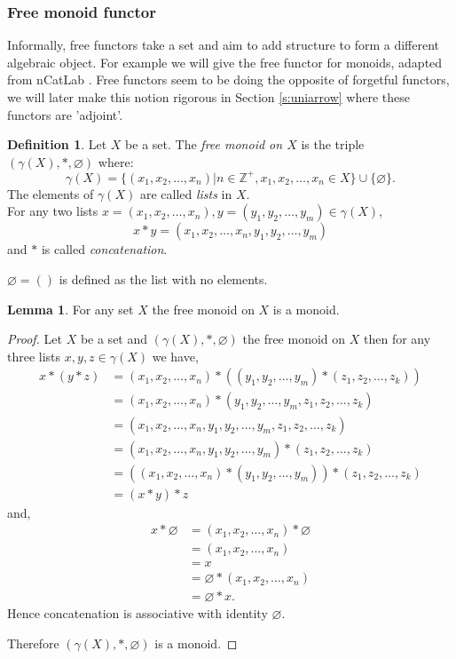 \documentclass[11pt,a4paper]{article}
\theoremstyle{definition}
\newtheorem{lemma}[thm]{Lemma}
\newtheorem{definition}[thm]{Definition}
\numberwithin{equation}{section}
\begin{document}
\subsubsection{Free monoid functor}
\label{sss:freefunctors}
Informally, free functors take a set and aim to add structure to form a different algebraic object. For example we will give the free functor for monoids, adapted from nCatLab \cite{nLab}. Free functors seem to be doing the opposite of forgetful functors, we will later make this notion rigorous in Section \ref{s:uniarrow} where these functors are 'adjoint'.
\begin{definition}
\label{def:freemonoid}
Let $X$ be a set. The \emph{free monoid on $X$} is the triple $(\gamma(X),*,\varnothing)$ where: \[\gamma(X)=\{(x_{1},x_{2},\dots,x_{n})|n\in\mathbb{Z}^{+}, x_{1},x_{2},\dots,x_{n}\in X\}\cup\{\varnothing\}.\] The elements of $\gamma(X)$ are called \emph{lists} in $X$.\\
    For any two lists $x=(x_{1},x_{2},\dots,x_{n}),y=(y_{1},y_{2},\dots,y_{m})\in\gamma(X)$, \[x*y = (x_{1},x_{2},\dots,x_{n},y_{1},y_{2},\dots,y_{m})\] and $*$ is called \emph{concatenation}.
    
    $\varnothing=()$ is defined as the list with no elements.
\end{definition}

\begin{lemma}
For any set $X$ the free monoid on $X$ is a monoid.
\end{lemma}
\begin{proof}
Let $X$ be a set and $(\gamma(X),*,\varnothing)$ the free monoid on $X$ then for any three lists $x,y,z\in\gamma(X)$ we have,
    \begin{align*}
        x*(y*z) &= (x_{1},x_{2},\dots,x_{n})*((y_{1},y_{2},\dots,y_{m})*(z_{1},z_{2},\dots,z_{k}))\\
        &= (x_{1},x_{2},\dots,x_{n}) * (y_{1},y_{2},\dots,y_{m},z_{1},z_{2},\dots,z_{k})\\
        &= (x_{1},x_{2},\dots,x_{n},y_{1},y_{2},\dots,y_{m},z_{1},z_{2},\dots,z_{k})\\
        &= (x_{1},x_{2},\dots,x_{n},y_{1},y_{2},\dots,y_{m})*(z_{1},z_{2},\dots,z_{k})\\
        &= ((x_{1},x_{2},\dots,x_{n})*(y_{1},y_{2},\dots,y_{m}))*(z_{1},z_{2},\dots,z_{k})\\
        &= (x*y)*z
    \end{align*}
    and,
    \begin{align*}
        x*\varnothing &= (x_{1},x_{2},\dots,x_{n})*\varnothing\\
        &=(x_{1},x_{2},\dots,x_{n})\\
        &=x\\
        &=\varnothing*(x_{1},x_{2},\dots,x_{n})\\
        &=\varnothing*x.
    \end{align*}
    Hence concatenation is associative with identity $\varnothing$. 
    
    Therefore $(\gamma(X),*,\varnothing)$ is a monoid.
\end{proof}
\end{document}

